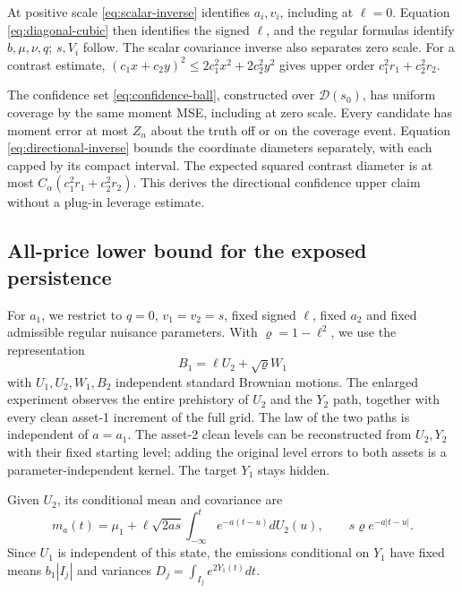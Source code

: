 \documentclass[11pt,a4paper]{amsart}
\theoremstyle{plain}
\theoremstyle{definition}
\theoremstyle{remark}
\begin{document}
At positive scale \eqref{eq:scalar-inverse} identifies $a_i,v_i$,
including at $\ell=0$. Equation \eqref{eq:diagonal-cubic} then identifies
the signed $\ell$, and the regular formulas identify $b,\mu,\nu,q$;
$s,V_i$ follow. The scalar covariance inverse also separates zero scale.
For a contrast estimate, $(c_1x+c_2y)^2\le2c_1^2x^2+2c_2^2y^2$ gives
upper order $c_1^2r_1+c_2^2r_2$.

The confidence set \eqref{eq:confidence-ball}, constructed over
$\mathcal D(s_0)$, has uniform coverage by the same moment MSE,
including at zero scale. Every candidate has moment error at most $Z_n$
about the truth off or on the coverage event. Equation
\eqref{eq:directional-inverse} bounds the coordinate diameters separately,
with each capped by its compact interval. The expected squared contrast diameter
is at most $C_\alpha(c_1^2r_1+c_2^2r_2)$. This derives the directional
confidence upper claim without a plug-in leverage estimate.

\subsection{All-price lower bound for the exposed persistence}

For $a_1$, we restrict to $q=0$, $v_1=v_2=s$, fixed signed $\ell$, fixed
$a_2$ and fixed admissible regular nuisance parameters. With $\varrho=1-\ell^2$,
we use the representation
\[
 B_1=\ell U_2+\sqrt{\varrho}W_1
\]
with $U_1,U_2,W_1,B_2$ independent standard Brownian motions. The enlarged
experiment observes the entire prehistory of $U_2$ and the $Y_2$ path,
together with every clean asset-1 increment of the full grid. The law of
the two paths is independent of $a=a_1$. The asset-2 clean levels can be reconstructed from
$U_2,Y_2$ with their fixed starting level; adding the original level
errors to both assets is a parameter-independent kernel. The target
$Y_1$ stays hidden.

Given $U_2$, its conditional mean and covariance are
\begin{equation}\label{eq:a1-conditional}
 m_a(t)=\mu_1+\ell\sqrt{2as}\int_{-\infty}^t e^{-a(t-u)}dU_2(u),
 \qquad s\varrho e^{-a|t-u|}.
\end{equation}
Since $U_1$ is independent of this state, the emissions conditional on
$Y_1$ have fixed means $b_1|I_j|$ and variances
$D_j=\int_{I_j}e^{2Y_1(t)}dt$.
\end{document}
